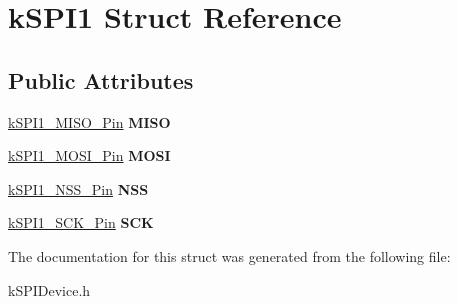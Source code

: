 \hypertarget{structkSPI1}{}\section{k\+S\+P\+I1 Struct Reference}
\label{structkSPI1}
\subsection*{Public Attributes}
\begin{DoxyCompactItemize}
\item 
\hyperlink{structkSPI1__MISO__Pin}{k\+S\+P\+I1\+\_\+\+M\+I\+S\+O\+\_\+\+Pin} {\bfseries M\+I\+SO}\hypertarget{structkSPI1_ac63e07e554c99cd319ed780a567ec77f}{}\label{structkSPI1_ac63e07e554c99cd319ed780a567ec77f}

\item 
\hyperlink{structkSPI1__MOSI__Pin}{k\+S\+P\+I1\+\_\+\+M\+O\+S\+I\+\_\+\+Pin} {\bfseries M\+O\+SI}\hypertarget{structkSPI1_a54cbe73c217faf27131a6d37fd159dae}{}\label{structkSPI1_a54cbe73c217faf27131a6d37fd159dae}

\item 
\hyperlink{structkSPI1__NSS__Pin}{k\+S\+P\+I1\+\_\+\+N\+S\+S\+\_\+\+Pin} {\bfseries N\+SS}\hypertarget{structkSPI1_a8fa4ced92a9ced00a041e7e5d25e728a}{}\label{structkSPI1_a8fa4ced92a9ced00a041e7e5d25e728a}

\item 
\hyperlink{structkSPI1__SCK__Pin}{k\+S\+P\+I1\+\_\+\+S\+C\+K\+\_\+\+Pin} {\bfseries S\+CK}\hypertarget{structkSPI1_a6602ea3bcd980860bdc9ba0d93dc216c}{}\label{structkSPI1_a6602ea3bcd980860bdc9ba0d93dc216c}

\end{DoxyCompactItemize}


The documentation for this struct was generated from the following file\+:\begin{DoxyCompactItemize}
\item 
k\+S\+P\+I\+Device.\+h\end{DoxyCompactItemize}
